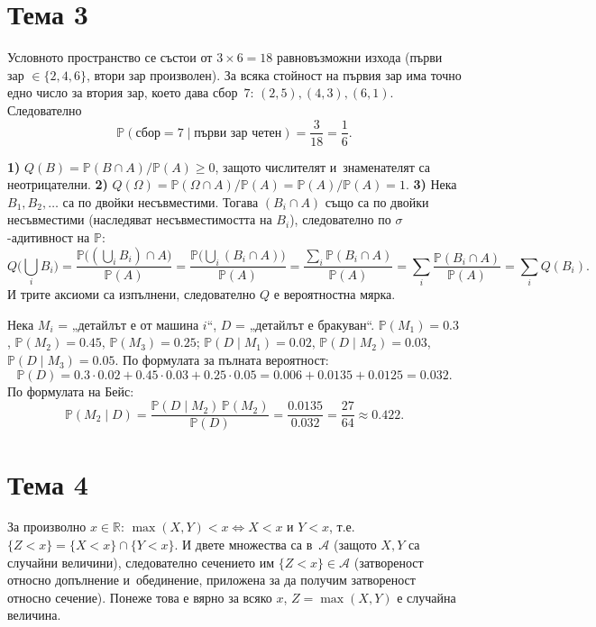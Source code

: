 \section*{Тема 3}

\begin{proofbox}
Условното пространство се състои от $3\times6=18$ равновъзможни
изхода (първи зар $\in\{2,4,6\}$, втори зар произволен). За всяка
стойност на първия зар има точно едно число за втория зар, което
дава сбор~$7$: $(2,5),(4,3),(6,1)$. Следователно
\[
  \mathbb P(\text{сбор}=7 \mid \text{първи зар четен}) = \frac3{18}
  = \frac16.
\]
\end{proofbox}

\begin{proofbox}
\textbf{1)} $Q(B)=\mathbb P(B\cap A)/\mathbb P(A)\ge0$, защото
числителят и~знаменателят са неотрицателни. \textbf{2)} $Q(\Omega)=
\mathbb P(\Omega\cap A)/\mathbb P(A) = \mathbb P(A)/\mathbb P(A)=1$.
\textbf{3)} Нека $B_1,B_2,\dots$ са по двойки несъвместими. Тогава
$(B_i\cap A)$ също са по двойки несъвместими (наследяват
несъвместимостта на $B_i$), следователно по $\sigma$-адитивност на
$\mathbb P$:
\[
  Q\Big(\bigcup_i B_i\Big) = \frac{\mathbb P\big((\bigcup_iB_i)\cap A
  \big)}{\mathbb P(A)} = \frac{\mathbb P\big(\bigcup_i(B_i\cap A)
  \big)}{\mathbb P(A)} = \frac{\sum_i \mathbb P(B_i\cap A)}{\mathbb
  P(A)} = \sum_i \frac{\mathbb P(B_i\cap A)}{\mathbb P(A)} = \sum_i
  Q(B_i).
\]
И трите аксиоми са изпълнени, следователно $Q$ е вероятностна мярка.
\qedbg
\end{proofbox}

\begin{proofbox}
Нека $M_i$ = „детайлът е от машина $i$“, $D$ = „детайлът е бракуван“.
$\mathbb P(M_1)=0.3$, $\mathbb P(M_2)=0.45$, $\mathbb P(M_3)=0.25$;
$\mathbb P(D\mid M_1)=0.02$, $\mathbb P(D\mid M_2)=0.03$, $\mathbb
P(D\mid M_3)=0.05$. По формулата за пълната вероятност:
\[
  \mathbb P(D) = 0.3\cdot0.02+0.45\cdot0.03+0.25\cdot0.05 = 0.006+
  0.0135+0.0125 = 0.032.
\]
По формулата на Бейс:
\[
  \mathbb P(M_2\mid D) = \frac{\mathbb P(D\mid M_2)\,\mathbb P(M_2)}
  {\mathbb P(D)} = \frac{0.0135}{0.032} = \frac{27}{64} \approx
  0.422.
\]
\end{proofbox}

\section*{Тема 4}

\begin{proofbox}
За произволно $x\in\mathbb R$: $\max(X,Y)<x \iff X<x \text{ и~} Y<x$,
т.е.\ $\{Z<x\}=\{X<x\}\cap\{Y<x\}$. И двете множества са в~$\mathcal
A$ (защото $X,Y$ са случайни величини), следователно сечението им
$\{Z<x\}\in\mathcal A$ (затвореност относно допълнение и~обединение,
приложена за да получим затвореност относно сечение). Понеже това е
вярно за всяко $x$, $Z=\max(X,Y)$ е случайна величина. \qedbg
\end{proofbox}

